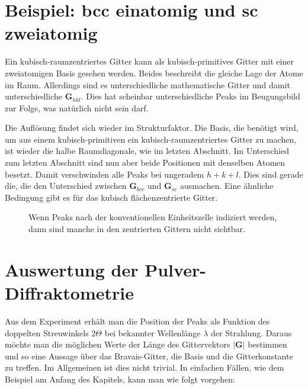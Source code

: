 \section{Beispiel: bcc einatomig und sc zweiatomig}

Ein kubisch-raumzentriertes Gitter  kann als kubisch-primitives Gitter mit einer zweiatomigen Basis gesehen werden. Beides beschreibt die gleiche Lage der Atome im Raum. Allerdings sind es unterschiedliche mathematische Gitter und damit unterschiedliche $\mathbf{G}_{hkl}$. Dies hat scheinbar unterschiedliche Peaks im Beugungsbild zur Folge, was natürlich nicht sein darf.

Die Auflösung findet sich wieder im Strukturfaktor. Die Basis, die benötigt wird, um aus einem  kubisch-primitiven ein kubisch-raumzentriertes Gitter  zu machen, ist wieder die halbe Raumdiagonale, wie im letzten Abschnitt. Im Unterschied zum letzten Abschnitt sind nun aber beide Positionen mit denselben Atomen besetzt. Damit verschwinden alle Peaks bei ungeradem $ h+k+l $. Dies sind gerade die, die den Unterschied zwischen $\mathbf{G}_{bcc} $ und  $\mathbf{G}_{sc} $ ausmachen. Eine ähnliche Bedingung gibt es für das kubisch flächenzentrierte Gitter.


\begin{figure}
  \caption{Wenn Peaks nach der konventionellen Einheitszelle indiziert werden, dann sind manche in den zentrierten Gittern nicht sichtbar. }
\end{figure}


\section{Auswertung der Pulver-Diffraktometrie}

Aus dem Experiment erhält man die Position der Peaks als Funktion des doppelten Streuwinkels $2\Theta$ bei bekannter Wellenlänge $\lambda$ der Strahlung. Daraus möchte man die möglichen Werte der Länge des Gittervektors $|\mathbf{G}|$ bestimmen und so eine Aussage über das Bravais-Gitter, die Basis und die Gitterkonstante zu treffen. Im Allgemeinen ist dies nicht trivial. In einfachen Fällen, wie dem Beispiel am Anfang des Kapitels, kann man wie folgt vorgehen:

